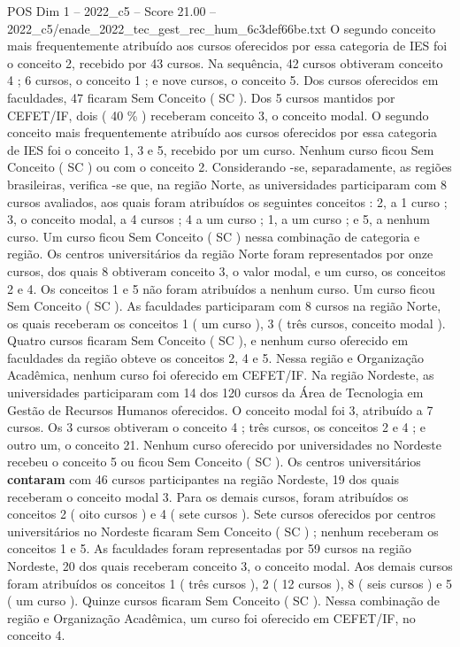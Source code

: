 \begin{textsample}{POS Dim 1 – 2022\_c5 – Score 21.00 – 2022\_c5/enade\_2022\_tec\_gest\_rec\_hum\_6c3def66be.txt}
O segundo conceito mais frequentemente atribuído aos cursos oferecidos por essa categoria de IES foi o conceito 2, recebido por 43 cursos.
Na sequência, 42 cursos obtiveram conceito 4 ; 6 cursos, o conceito 1 ; e nove cursos, o conceito 5.
Dos cursos oferecidos em faculdades, 47 ficaram Sem Conceito ( SC ).
Dos 5 cursos mantidos por CEFET/IF, dois ( 40 \% ) receberam conceito 3, o conceito modal.
O segundo conceito mais frequentemente atribuído aos cursos oferecidos por essa categoria de IES foi o conceito 1, 3 e 5, recebido por um curso.
Nenhum curso ficou Sem Conceito ( SC ) ou com o conceito 2.
Considerando -se, separadamente, as regiões brasileiras, verifica -se que, na região Norte, as universidades participaram com 8 cursos avaliados, aos quais foram atribuídos os seguintes conceitos : 2, a 1 curso ; 3, o conceito modal, a 4 cursos ; 4 a um curso ; 1, a um curso ; e 5, a nenhum curso.
Um curso ficou Sem Conceito ( SC ) nessa combinação de categoria e região.
Os centros universitários da região Norte foram representados por onze cursos, dos quais 8 obtiveram conceito 3, o valor modal, e um curso, os conceitos 2 e 4.
Os conceitos 1 e 5 não foram atribuídos a nenhum curso.
Um curso ficou Sem Conceito ( SC ).
As faculdades participaram com 8 cursos na região Norte, os quais receberam os conceitos 1 ( um curso ), 3 ( três cursos, conceito modal ).
Quatro cursos ficaram Sem Conceito ( SC ), e nenhum curso oferecido em faculdades da região obteve os conceitos 2, 4 e 5.
Nessa região e Organização Acadêmica, nenhum curso foi oferecido em CEFET/IF.
Na região Nordeste, as universidades participaram com 14 dos 120 cursos da Área de Tecnologia em Gestão de Recursos Humanos oferecidos.
O conceito modal foi 3, atribuído a 7 cursos.
Os 3 cursos obtiveram o conceito 4 ; três cursos, os conceitos 2 e 4 ; e outro um, o conceito 21.
Nenhum curso oferecido por universidades no Nordeste recebeu o conceito 5 ou ficou Sem Conceito ( SC ).
Os centros universitários \textbf{contaram} com 46 cursos participantes na região Nordeste, 19 dos quais receberam o conceito modal 3.
Para os demais cursos, foram atribuídos os conceitos 2 ( oito cursos ) e 4 ( sete cursos ).
Sete cursos oferecidos por centros universitários no Nordeste ficaram Sem Conceito ( SC ) ; nenhum receberam os conceitos 1 e 5.
As faculdades foram representadas por 59 cursos na região Nordeste, 20 dos quais receberam conceito 3, o conceito modal.
Aos demais cursos foram atribuídos os conceitos 1 ( três cursos ), 2 ( 12 cursos ), 8 ( seis cursos ) e 5 ( um curso ).
Quinze cursos ficaram Sem Conceito ( SC ).
Nessa combinação de região e Organização Acadêmica, um curso foi oferecido em CEFET/IF, no conceito 4.

\end{textsample}
